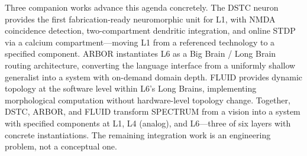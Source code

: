 \documentclass[12pt]{article}
\begin{document}
Three companion works advance this agenda concretely. The DSTC neuron \cite{lin2026dstc} provides the first fabrication-ready neuromorphic unit for L1, with NMDA coincidence detection, two-compartment dendritic integration, and online STDP via a calcium compartment---moving L1 from a referenced technology to a specified component. ARBOR \cite{lin2026arbor} instantiates L6 as a Big Brain / Long Brain routing architecture, converting the language interface from a uniformly shallow generalist into a system with on-demand domain depth. FLUID \cite{lin2026fluid} provides dynamic topology at the software level within L6's Long Brains, implementing morphological computation without hardware-level topology change. Together, DSTC, ARBOR, and FLUID transform SPECTRUM from a vision into a system with specified components at L1, L4 (analog), and L6---three of six layers with concrete instantiations. The remaining integration work is an engineering problem, not a conceptual one.
\end{document}
